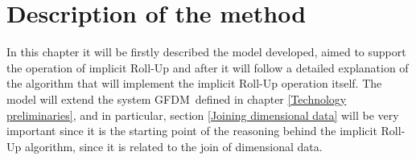 \documentclass[12pt,a4paper]{report}
\newcommand\systemName{GFDM}
\begin{document}
\chapter{Description of the method}\label{Description of the method}

In this chapter it will be firstly described the model developed, aimed to support the operation of implicit Roll-Up and after it will follow a detailed explanation of the algorithm that will implement the implicit Roll-Up operation itself.
%
The model will extend the system \systemName\, defined in chapter \ref{Technology preliminaries}, and in particular, section \ref{Joining dimensional data} will be very important since it is the starting point of the reasoning behind the implicit Roll-Up algorithm, since it is related to the join of dimensional data.
%
\end{document}
